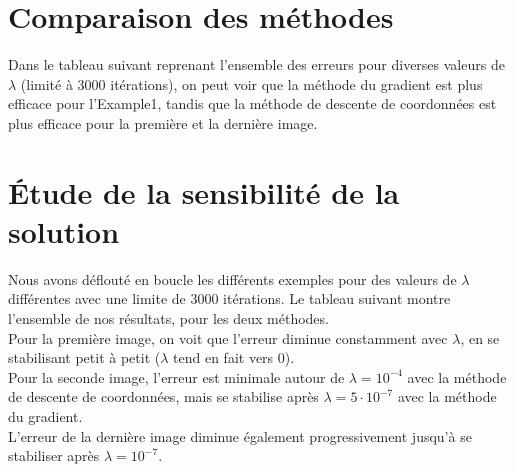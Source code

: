\documentclass[12pt, a4paper]{report}
\begin{document}
\section{Comparaison des méthodes}
Dans le tableau suivant reprenant l'ensemble des erreurs pour diverses valeurs de $\lambda$ (limité à 3000 itérations), on peut voir que la méthode du gradient est plus efficace pour l'Example1, tandis que la méthode de descente de coordonnées est plus efficace pour la première et la dernière image. \\


\section{Étude de la sensibilité de la solution}
Nous avons déflouté en boucle les différents exemples pour des valeurs de $\lambda$ différentes avec une limite de 3000 itérations. Le tableau suivant montre l'ensemble de nos résultats, pour les deux méthodes. \\

Pour la première image, on voit que l'erreur diminue constamment avec $\lambda$, en se stabilisant petit à petit ($\lambda$ tend en fait vers 0). \\
Pour la seconde image, l'erreur est minimale autour de $\lambda = 10^{-4}$ avec la méthode de descente de coordonnées, mais se stabilise après $\lambda = 5\cdot10^{-7}$ avec la méthode du gradient. \\
L'erreur de la dernière image diminue également progressivement jusqu'à se stabiliser après $\lambda = 10^{-7}$.
\end{document}
